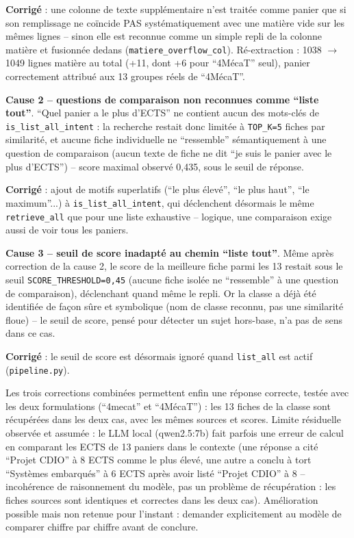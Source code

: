 \documentclass[11pt,a4paper]{report}
\begin{document}
\textbf{Corrigé} : une colonne de texte supplémentaire n'est traitée comme
panier que si son remplissage ne coïncide PAS systématiquement avec une
matière vide sur les mêmes lignes -- sinon elle est reconnue comme un simple
repli de la colonne matière et fusionnée dedans
(\texttt{matiere\_overflow\_col}). Ré-extraction : 1038 $\to$ 1049 lignes
matière au total (+11, dont +6 pour ``4MécaT'' seul), panier correctement
attribué aux 13 groupes réels de ``4MécaT''.

\textbf{Cause 2 -- questions de comparaison non reconnues comme ``liste
tout''}. ``Quel panier a le plus d'ECTS'' ne contient aucun des mots-clés de
\texttt{is\_list\_all\_intent} : la recherche restait donc limitée à
\texttt{TOP\_K=5} fiches par similarité, et aucune fiche individuelle ne
``ressemble'' sémantiquement à une question de comparaison (aucun texte de
fiche ne dit ``je suis le panier avec le plus d'ECTS'') -- score maximal
observé 0,435, sous le seuil de réponse.

\textbf{Corrigé} : ajout de motifs superlatifs (``le plus élevé'', ``le plus
haut'', ``le maximum''...) à \texttt{is\_list\_all\_intent}, qui déclenchent
désormais le même \texttt{retrieve\_all} que pour une liste exhaustive --
logique, une comparaison exige aussi de voir tous les paniers.

\textbf{Cause 3 -- seuil de score inadapté au chemin ``liste tout''}. Même
après correction de la cause 2, le score de la meilleure fiche parmi les 13
restait sous le seuil \texttt{SCORE\_THRESHOLD=0,45} (aucune fiche isolée ne
``ressemble'' à une question de comparaison), déclenchant quand même le
repli. Or la classe a déjà été identifiée de façon sûre et symbolique (nom de
classe reconnu, pas une similarité floue) -- le seuil de score, pensé pour
détecter un sujet hors-base, n'a pas de sens dans ce cas.

\textbf{Corrigé} : le seuil de score est désormais ignoré quand
\texttt{list\_all} est actif (\texttt{pipeline.py}).

\begin{statutfait}
Les trois corrections combinées permettent enfin une réponse correcte,
testée avec les deux formulations (``4mecat'' et ``4MécaT'') : les 13 fiches
de la classe sont récupérées dans les deux cas, avec les mêmes sources et
scores. Limite résiduelle observée et assumée : le LLM local (qwen2.5:7b)
fait parfois une erreur de calcul en comparant les ECTS de 13 paniers dans le
contexte (une réponse a cité ``Projet CDIO'' à 8 ECTS comme le plus élevé,
une autre a conclu à tort ``Systèmes embarqués'' à 6 ECTS après avoir listé
``Projet CDIO'' à 8 -- incohérence de raisonnement du modèle, pas un problème
de récupération : les fiches sources sont identiques et correctes dans les
deux cas). Amélioration possible mais non retenue pour l'instant : demander
explicitement au modèle de comparer chiffre par chiffre avant de conclure.
\end{statutfait}
\end{document}
